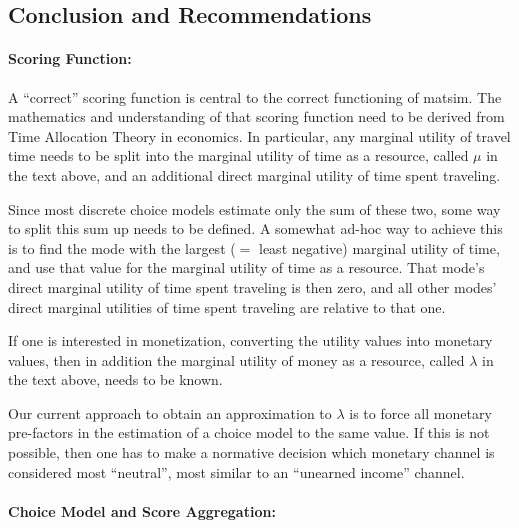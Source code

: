 
\subsection{Conclusion and Recommendations}

\paragraph*{Scoring Function:}

A ``correct'' scoring function is central to the correct functioning of \acrshort{matsim}.
%
The mathematics and understanding of that scoring function need to be derived from Time Allocation Theory in economics.  In particular, any marginal utility of travel time needs to be split into the marginal utility of time as a resource, called $\mu$ in the text above, and an additional direct marginal utility of time spent traveling.

Since most discrete choice models estimate only the sum of these two, some way to split this sum up needs to be defined.  A somewhat ad-hoc way to achieve this is to find the mode with the largest ($=$ least negative) marginal utility of time, and use that value for the marginal utility of time as a resource.  That mode's direct marginal utility of time spent traveling is then zero, and all other modes' direct marginal utilities of time spent traveling are relative to that one.

If one is interested in monetization, \ie converting the utility values into monetary values, then in addition the marginal utility of money as a resource, called $\lambda$ in the text above, needs to be known. 

Our current approach to obtain an approximation to $\lambda$ is to force all monetary pre-factors in the estimation of a choice model to the same value.  If this is not possible, then one has to make a normative decision which monetary channel is considered most ``neutral'', \ie most similar to an ``unearned income'' channel.

\paragraph*{Choice Model and Score Aggregation:}

